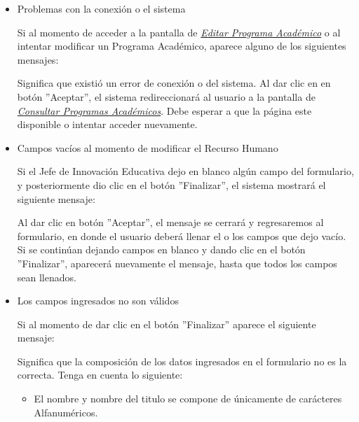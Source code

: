             \begin{itemize}
            	\item Problemas con la conexión o el sistema
            
                	Si al momento de acceder a la pantalla de \hyperlink{editarpa}{\textit{Editar Programa Académico}} o al intentar modificar un Programa Académico, aparece alguno de los siguientes mensajes:
            	    
            
                	Significa que existió un error de conexión o del sistema. Al dar clic en en botón ''Aceptar'', el sistema redireccionará al usuario a la pantalla de \hyperlink{consultarpa}{\textit{Consultar Programas Académicos}}. Debe esperar a que la página este disponible o intentar acceder nuevamente.
            
            	\item Campos vacíos al momento de modificar el Recurso Humano
            
                	Si el Jefe de Innovación Educativa dejo en blanco algún campo del formulario, y posteriormente dio clic en el botón ''Finalizar'', el sistema mostrará el siguiente mensaje:
            	    
            
            	    Al dar clic en botón ''Aceptar'', el mensaje se cerrará y regresaremos al formulario, en donde el usuario deberá llenar el o los campos que dejo vacío. Si se continúan dejando campos en blanco y dando clic en el botón ''Finalizar'', aparecerá nuevamente el mensaje, hasta que todos los campos sean llenados.
            
            	\item Los campos ingresados no son válidos
    
                	Si al momento de dar clic en el botón ''Finalizar'' aparece el siguiente mensaje:
            
                	Significa que la composición de los datos ingresados en el formulario no es la correcta. Tenga en cuenta lo siguiente:
            
                	\begin{itemize}
                		\item El nombre y nombre del titulo se compone de únicamente de carácteres Alfanuméricos.
                	\end{itemize}
            
            \end{itemize}
